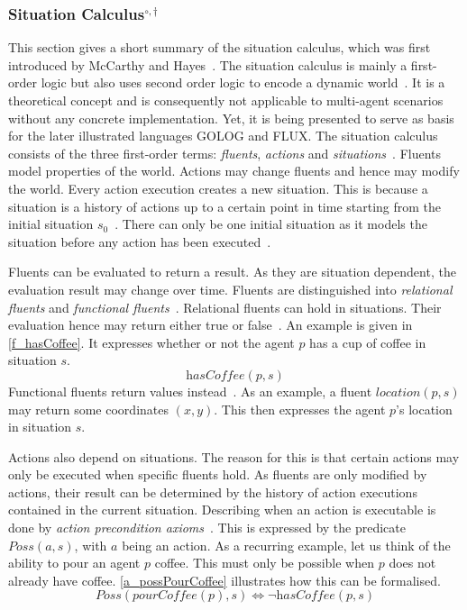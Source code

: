 \subsubsection[Situation Calculus]{Situation Calculus$^{\circ,\dagger}$}\label{fun:apl_sitCalc}
This section gives a short summary of the situation calculus, which was first introduced by McCarthy and Hayes~\cite{mccarthy_philosophical_1969}.
The situation calculus is mainly a first-order logic but also uses second order logic to encode a dynamic world~\cite{levesque_golog:_1997}. %
It is a theoretical concept and is consequently not applicable to multi-agent scenarios without any concrete implementation.
Yet, it is being presented to serve as basis for the later illustrated languages GOLOG and FLUX.
The situation calculus consists of the three first-order terms: \emph{fluents}, \emph{actions} and \emph{situations}~\cite{mccarthy_philosophical_1969,boutilier_decision_2000}. %
Fluents model properties of the world.
Actions may change fluents and hence may modify the world.
Every action execution creates a new situation.
This is because a situation is a history of actions up to a certain point in time starting from the initial situation $s_0$~\cite{schiffel_reconciling_2006,levesque_golog:_1997}. %
There can only be one initial situation as it models the situation before any action has been executed~\cite{pirri_contributions_1999}. %

Fluents can be evaluated to return a result.
As they are situation dependent, the evaluation result may change over time.
Fluents are distinguished into \emph{relational fluents} and \emph{functional fluents}~\cite{levesque_golog:_1997}. %
Relational fluents can hold in situations.
Their evaluation hence may return either true or false~\cite{boutilier_decision_2000}. %
An example is given in \autoref{f_hasCoffee}.
It expresses whether or not the agent $p$ has a cup of coffee in situation $s$.
\begin{equation}\label{f_hasCoffee}
  \textit{hasCoffee}(p,s)
\end{equation}
Functional fluents return values instead~\cite{levesque_golog:_1997}. %
As an example, a fluent $\textit{location}(p,s)$ may return some coordinates $(x,y)$.
This then expresses the agent $p$'s location in situation $s$.

Actions also depend on situations.
The reason for this is that certain actions may only be executed when specific fluents hold.
As fluents are only modified by actions, their result can be determined by the history of action executions contained in the current situation.
Describing when an action is executable is done by \emph{action precondition axioms}~\cite{lin_state_1994}. %
This is expressed by the predicate $\textit{Poss}(a,s)$, with $a$ being an action.
As a recurring example, let us think of the ability to pour an agent $p$ coffee.
This must only be possible when $p$ does not already have coffee.
\autoref{a_possPourCoffee} illustrates how this can be formalised.
\begin{equation}\label{a_possPourCoffee}
  \textit{Poss}(\textit{pourCoffee}(p),s) \Leftrightarrow \neg \textit{hasCoffee}(p,s)
\end{equation}

